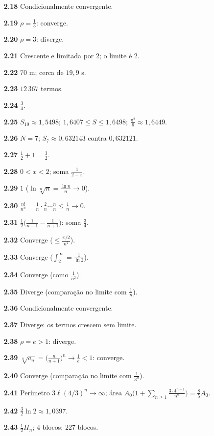 {\begin{multicols}{2}
\begin{itemize}[leftmargin=2.7em,labelsep=0.5em,itemsep=1pt]
\item[\textbf{2.18}] Condicionalmente convergente.
\item[\textbf{2.19}] $\rho=\tfrac13$: converge.
\item[\textbf{2.20}] $\rho=3$: diverge.
\item[\textbf{2.21}] Crescente e limitada por $2$; o limite é $2$.
\item[\textbf{2.22}] $70$ m; cerca de $19{,}9$ s.
\item[\textbf{2.23}] $12\,367$ termos.
\item[\textbf{2.24}] $\tfrac34$.
\item[\textbf{2.25}] $S_{10}\approx1{,}5498$; $1{,}6407\le S\le1{,}6498$; $\frac{\pi^2}6\approx1{,}6449$.
\item[\textbf{2.26}] $N=7$; $S_7\approx0{,}632143$ contra $0{,}632121$.
\item[\textbf{2.27}] $\tfrac12+1=\tfrac32$.
\item[\textbf{2.28}] $0<x<2$; soma $\tfrac1{2-x}$.
\item[\textbf{2.29}] $1$ ($\ln\sqrt[n]n=\tfrac{\ln n}n\to0$).
\item[\textbf{2.30}] $\tfrac{n!}{n^n}=\tfrac1n\cdot\tfrac2n\cdots\tfrac nn\le\tfrac1n\to0$.
\item[\textbf{2.31}] $\tfrac12\big(\tfrac1{n-1}-\tfrac1{n+1}\big)$: soma $\tfrac34$.
\item[\textbf{2.32}] Converge ($\le\tfrac{\pi/2}{n^2}$).
\item[\textbf{2.33}] Converge ($\int_2^\infty=\tfrac1{\ln2}$).
\item[\textbf{2.34}] Converge (como $\tfrac1{n^2}$).
\item[\textbf{2.35}] Diverge (comparação no limite com $\tfrac1n$).
\item[\textbf{2.36}] Condicionalmente convergente.
\item[\textbf{2.37}] Diverge: os termos crescem sem limite.
\item[\textbf{2.38}] $\rho=e>1$: diverge.
\item[\textbf{2.39}] $\sqrt[n]{a_n}=\big(\tfrac n{n+1}\big)^n\to\tfrac1e<1$: converge.
\item[\textbf{2.40}] Converge (comparação no limite com $\tfrac1{3^n}$).
\item[\textbf{2.41}] Perímetro $3\ell(4/3)^n\to\infty$; área $A_0\big(1+\sum_{n\ge1}\frac{3\cdot4^{n-1}}{9^n}\big)=\frac85A_0$.
\item[\textbf{2.42}] $\tfrac32\ln2\approx1{,}0397$.
\item[\textbf{2.43}] $\frac12H_n$; $4$ blocos; $227$ blocos.

\end{itemize}
\end{multicols}}
